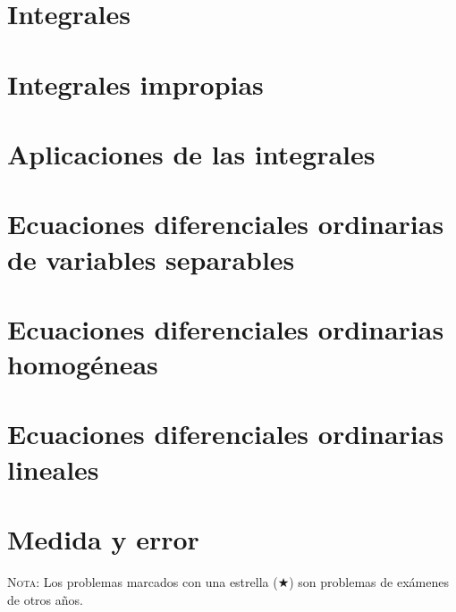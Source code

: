 \documentclass[a4paper,titlepage,dvips]{article}
\begin{document}
\section{Integrales}
\begin{enumerate}[leftmargin=*]
\end{enumerate}

\section{Integrales impropias}
\begin{enumerate}[leftmargin=*]
\end{enumerate}

\section{Aplicaciones de las integrales}
\begin{enumerate}[leftmargin=*]
\end{enumerate}

\section{Ecuaciones diferenciales ordinarias de variables separables}
\begin{enumerate}[leftmargin=*]
\end{enumerate}

\section{Ecuaciones diferenciales ordinarias homogéneas}
\begin{enumerate}[leftmargin=*]
\end{enumerate}

\section{Ecuaciones diferenciales ordinarias lineales}
\begin{enumerate}[leftmargin=*]
\end{enumerate}

\section{Medida y error}
\begin{enumerate}[leftmargin=*]
\end{enumerate}

\vspace{2cm}

\textsc{Nota}: Los problemas marcados con una estrella ($\bigstar$) son problemas de
exámenes de otros años.
\end{document}
